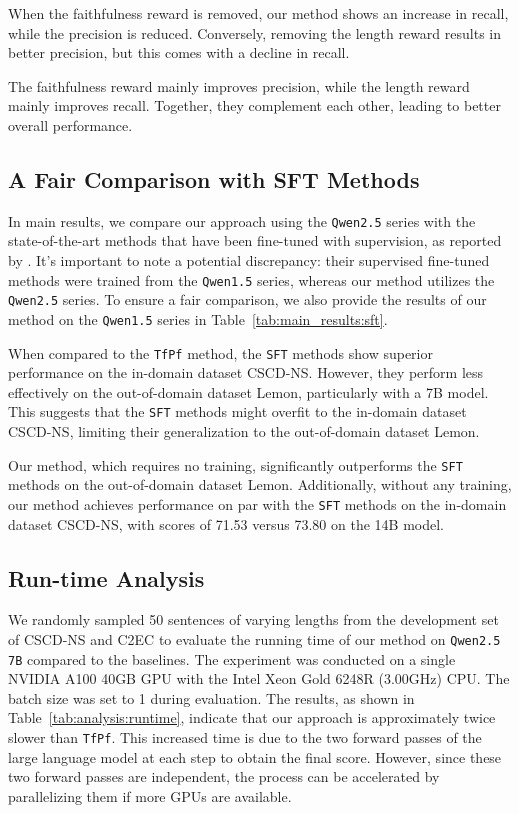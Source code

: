 When the faithfulness reward is removed, our method shows an increase in recall, while the precision is reduced.
Conversely, removing the length reward results in better precision, but this comes with a decline in recall.

The faithfulness reward mainly improves precision, while the length reward mainly improves recall.
Together, they complement each other, leading to better overall performance.

\subsection{A Fair Comparison with SFT Methods}
\label{app:supervised_fine_tuning}
In main results, we compare our approach using the \texttt{Qwen2.5} series with the state-of-the-art methods that have been fine-tuned with supervision, as reported by \cite{li-etal-2024-cllm}.
It's important to note a potential discrepancy: their supervised fine-tuned methods were trained from the \texttt{Qwen1.5} series, whereas our method utilizes the \texttt{Qwen2.5} series.
To ensure a fair comparison, we also provide the results of our method on the \texttt{Qwen1.5} series in Table~\ref{tab:main_results:sft}.


When compared to the \texttt{TfPf} method, the \texttt{SFT} methods show superior performance on the in-domain dataset CSCD-NS.
However, they perform less effectively on the out-of-domain dataset Lemon, particularly with a 7B model.
This suggests that the \texttt{SFT} methods might overfit to the in-domain dataset CSCD-NS, limiting their generalization to the out-of-domain dataset Lemon.

Our method, which requires no training, significantly outperforms the \texttt{SFT} methods on the out-of-domain dataset Lemon.
Additionally, without any training, our method achieves performance on par with the \texttt{SFT} methods on the in-domain dataset CSCD-NS, with scores of 71.53 versus 73.80 on the 14B model.

\subsection{Run-time Analysis}
\label{app:runtime}
We randomly sampled 50 sentences of varying lengths from the development set of CSCD-NS and C2EC to evaluate the running time of our method on \texttt{Qwen2.5\,7B} compared to the baselines.
The experiment was conducted on a single NVIDIA A100 40GB GPU with the Intel Xeon Gold 6248R (3.00GHz) CPU.
The batch size was set to 1 during evaluation.
The results, as shown in Table~\ref{tab:analysis:runtime}, indicate that our approach is approximately twice slower than \texttt{TfPf}.
This increased time is due to the two forward passes of the large language model at each step to obtain the final score.
However, since these two forward passes are independent, the process can be accelerated by parallelizing them if more GPUs are available.


